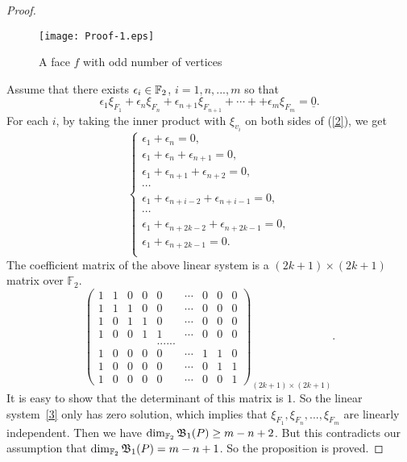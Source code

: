 \documentclass[12pt]{amsart}
\theoremstyle{plain} \numberwithin{equation}{section}
\theoremstyle{definition}
\theoremstyle{remark}
\begin{document}
\begin{proof}
\begin{figure}[h]
\texttt{[image: Proof-1.eps]}
\caption{A face $f$ with odd number of vertices}
\label{p:Proof-1}
\end{figure}

Assume that there exists $\epsilon_i\in {\Bbb F}_2$, $i=1, n, ..., m$ so that
\begin{equation}\label{2}
  \epsilon_1\xi_{F_1}+\epsilon_n\xi_{F_n}+\epsilon_{n+1}\xi_{F_{n+1}}+\cdots++\epsilon_m\xi_{F_m}
   =\underline{0}.
\end{equation}
 For each $i$, by taking the inner product with $\xi_{v_i}$
  on both sides of (\ref{2}),  we get 
 \begin{equation}\label{3}
   \begin{cases}
  \epsilon_1 +\epsilon_n =0,\\
  \epsilon_1+\epsilon_n+\epsilon_{n+1} =0,\\
  \epsilon_1+\epsilon_{n+1}+\epsilon_{n+2} =0,\\
  \cdots\\
  \epsilon_1+\epsilon_{n+i-2}+\epsilon_{n+i-1} =0,\\
  \cdots\\
  \epsilon_1+\epsilon_{n+2k-2}+\epsilon_{n+2k-1} =0,\\
  \epsilon_1+\epsilon_{n+2k-1} =0.\\
   \end{cases}
    \end{equation}
The coefficient matrix of the above linear system is a $(2k+1)\times (2k+1)$ matrix
over ${\mathbb F}_2$.
 $$
\begin{pmatrix}
1&1&0&0&0&\cdots&0&0&0\\
1&1&1&0&0&\cdots&0&0&0\\
1&0&1&1&0&\cdots&0&0&0\\
1&0&0&1&1&\cdots&0&0&0\\
&&&&......\\
1&0&0&0&0&\cdots&1&1&0\\
1&0&0&0&0&\cdots&0&1&1\\
1&0&0&0&0&\cdots&0&0&1
\end{pmatrix}_{(2k+1)\times (2k+1)}.$$
 It is easy to show that the determinant of this matrix is $1$. So  
 the linear system~\eqref{3} only has zero solution, which implies that
  $\xi_{F_1},\xi_{F_n}, ..., \xi_{F_m}$ are linearly independent.
 Then we have $\dim_{{\Bbb F}_2} \mathfrak{B}_1(P)\geq m-n+2$. But this contradicts our
  assumption that $\dim_{{\Bbb F}_2} \mathfrak{B}_1(P)=m-n+1$. So the proposition is proved.
\end{proof}
\end{document}
